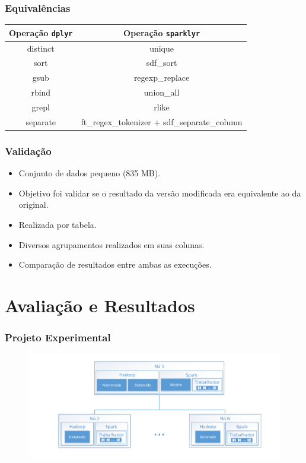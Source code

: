 \documentclass{beamer}
\begin{document}
\begin{frame}
 \frametitle{Equivalências}
 \begin{table}[H]
  \centering
  \small
  \begin{tabular}{c c} \toprule
  \textbf{Operação \texttt{dplyr}}  &  \textbf{Operação \texttt{sparklyr}}\\ 
  \midrule
  distinct	& unique  \\
  sort		& sdf\_sort \\
  gsub		& regexp\_replace\\
  rbind		& union\_all\\
  grepl		& rlike\\
  separate	& ft\_regex\_tokenizer + sdf\_separate\_column       \\
  \bottomrule
  \end{tabular}
  \end{table}
\end{frame}

\begin{frame}
 \frametitle{Validação}
 \begin{itemize}
  \item Conjunto de dados pequeno (835 MB).
  \item Objetivo foi validar se o resultado da versão modificada era 
equivalente ao da original.
  \item Realizada por tabela.
  \item Diversos agrupamentos realizados em suas colunas.
  \item Comparação de resultados entre ambas as execuções.
 \end{itemize}
\end{frame}


\section{Avaliação e Resultados}
\begin{frame}
 \frametitle{Projeto Experimental}
  \begin{figure}[ht]
  \hspace*{-0.5cm}
  \centerline{
  \includegraphics[scale=0.65]{./img/experiments_arch.pdf}}
  \end{figure}
\end{frame}
\end{document}

